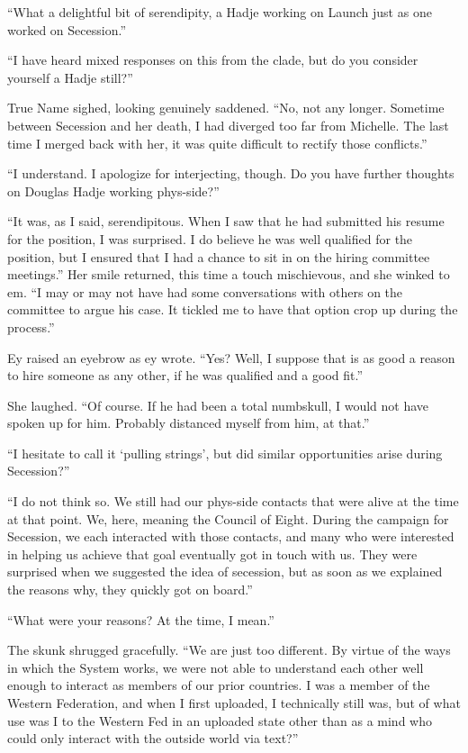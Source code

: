 ``What a delightful bit of serendipity, a Hadje working on Launch just as one worked on Secession.''

``I have heard mixed responses on this from the clade, but do you consider yourself a Hadje still?''

True Name sighed, looking genuinely saddened. ``No, not any longer. Sometime between Secession and her death, I had diverged too far from Michelle. The last time I merged back with her, it was quite difficult to rectify those conflicts.''

``I understand. I apologize for interjecting, though. Do you have further thoughts on Douglas Hadje working phys-side?''

``It was, as I said, serendipitous. When I saw that he had submitted his resume for the position, I was surprised. I do believe he was well qualified for the position, but I ensured that I had a chance to sit in on the hiring committee meetings.'' Her smile returned, this time a touch mischievous, and she winked to em. ``I may or may not have had some conversations with others on the committee to argue his case. It tickled me to have that option crop up during the process.''

Ey raised an eyebrow as ey wrote. ``Yes? Well, I suppose that is as good a reason to hire someone as any other, if he was qualified and a good fit.''

She laughed. ``Of course. If he had been a total numbskull, I would not have spoken up for him. Probably distanced myself from him, at that.''

``I hesitate to call it `pulling strings', but did similar opportunities arise during Secession?''

``I do not think so. We still had our phys-side contacts that were alive at the time at that point. We, here, meaning the Council of Eight. During the campaign for Secession, we each interacted with those contacts, and many who were interested in helping us achieve that goal eventually got in touch with us. They were surprised when we suggested the idea of secession, but as soon as we explained the reasons why, they quickly got on board.''

``What were your reasons? At the time, I mean.''

The skunk shrugged gracefully. ``We are just too different. By virtue of the ways in which the System works, we were not able to understand each other well enough to interact as members of our prior countries. I was a member of the Western Federation, and when I first uploaded, I technically still was, but of what use was I to the Western Fed in an uploaded state other than as a mind who could only interact with the outside world via text?''

